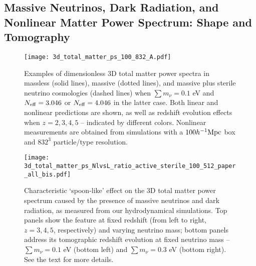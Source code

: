 \documentclass{emulateapj}
\begin{document}

\subsection{Massive Neutrinos, Dark Radiation, and Nonlinear Matter Power Spectrum: Shape and Tomography}

\begin{figure}
\centering
\texttt{[image: 3d\_total\_matter\_ps\_100\_832\_A.pdf]}   
\caption{Examples of dimensionless 3D total matter power spectra in massless (solid lines), massive (dotted lines), and
massive plus sterile neutrino cosmologies (dashed lines)
when $\sum m_{\nu}=0.1$ eV and $N_{\rm eff}=3.046$ or $N_{\rm eff}=4.046$ in the latter case. 
Both linear and nonlinear predictions are shown, as well as redshift evolution effects when $z=2,3,4,5$ -- indicated by different colors.
Nonlinear measurements are obtained from simulations with a $100h^{-1}{\rm Mpc}$ box and $832^3$ particle/type resolution.}
\label{fig_3dps_examples}
\end{figure} 
 
\begin{figure*}
\centering
\texttt{[image: 3d\_total\_matter\_ps\_NlvsL\_ratio\_active\_sterile\_100\_512\_paper\_all\_bis.pdf]}    
\caption{Characteristic `spoon-like' effect on the 3D total matter power spectrum caused by the presence of massive neutrinos and dark radiation,  
as measured from our hydrodynamical simulations. Top panels  
show the feature at fixed redshift (from left to right, $z=3,4,5$, respectively) and varying neutrino mass; bottom panels 
address its tomographic redshift evolution at fixed neutrino mass -- $\sum m_{\nu} =0.1$ eV (bottom left) and $\sum m_{\nu} =0.3$ eV (bottom right).  
See the text for more details.}
\label{fig_3dps_spoon_1}
\end{figure*}

\end{document}
